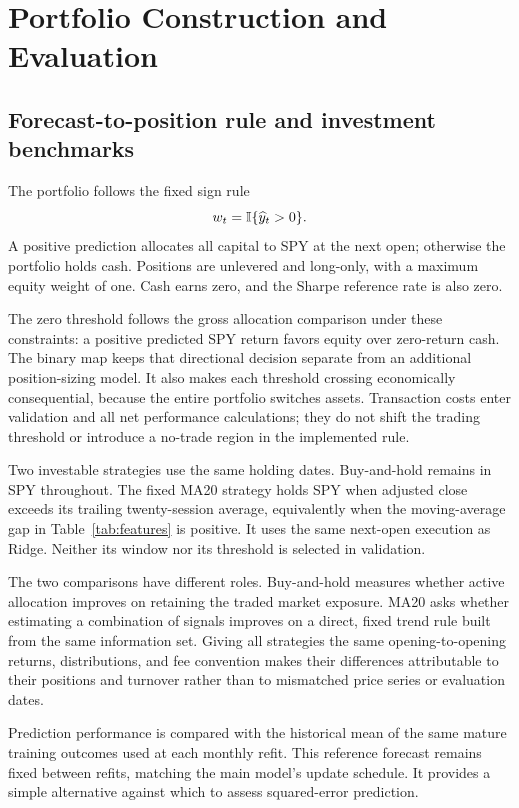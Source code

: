 \section{Portfolio Construction and Evaluation}
\label{sec:accounting}
\subsection{Forecast-to-position rule and investment benchmarks}
The portfolio follows the fixed sign rule
\begin{equation}
w_t=\mathbb{I}\{\widehat y_t>0\}.
\label{eq:weight}
\end{equation}
A positive prediction allocates all capital to SPY at the next open; otherwise the portfolio holds cash. Positions are unlevered and long-only, with a maximum equity weight of one. Cash earns zero, and the Sharpe reference rate is also zero.

The zero threshold follows the gross allocation comparison under these constraints: a positive predicted SPY return favors equity over zero-return cash. The binary map keeps that directional decision separate from an additional position-sizing model. It also makes each threshold crossing economically consequential, because the entire portfolio switches assets. Transaction costs enter validation and all net performance calculations; they do not shift the trading threshold or introduce a no-trade region in the implemented rule.

Two investable strategies use the same holding dates. Buy-and-hold remains in SPY throughout. The fixed MA20 strategy holds SPY when adjusted close exceeds its trailing twenty-session average, equivalently when the moving-average gap in Table~\ref{tab:features} is positive. It uses the same next-open execution as Ridge. Neither its window nor its threshold is selected in validation.

The two comparisons have different roles. Buy-and-hold measures whether active allocation improves on retaining the traded market exposure. MA20 asks whether estimating a combination of signals improves on a direct, fixed trend rule built from the same information set. Giving all strategies the same opening-to-opening returns, distributions, and fee convention makes their differences attributable to their positions and turnover rather than to mismatched price series or evaluation dates.

Prediction performance is compared with the historical mean of the same mature training outcomes used at each monthly refit. This reference forecast remains fixed between refits, matching the main model's update schedule. It provides a simple alternative against which to assess squared-error prediction.

